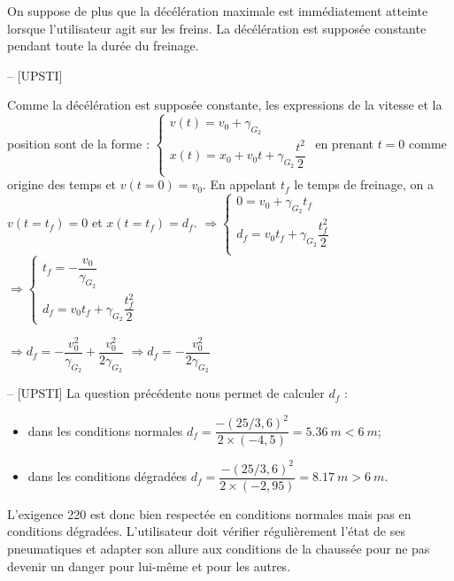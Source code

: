 On suppose de plus que la décélération maximale est immédiatement atteinte lorsque l'utilisateur agit sur les freins. La décélération est supposée constante pendant toute la durée du freinage.
\fi

\ifprof
\begin{corrige}-- [UPSTI]

Comme la décélération est supposée constante, les expressions de la vitesse et la position sont de la forme :
$\left\{
\begin{array}{l}
v(t)=v_0+\gamma_{G_2} \\
x(t)=x_0+v_0 t+\gamma_{G_2}  \dfrac{t^2}{2} \\
\end{array}
\right.$
en prenant $t=0$ comme origine des temps et $v(t=0)=v_0$.
En appelant $t_f$ le temps de freinage, on a $v(t=t_f)=0$ et $x(t=t_f)=d_f$.
$\Rightarrow 
\left\{
\begin{array}{l}
0=v_0+\gamma_{G_2 } t_f \\
d_f=v_0 t_f+\gamma_{G_2} \dfrac{t_f^2}{2} \\
\end{array}
\right.$
$\Rightarrow 
\left\{
\begin{array}{l}
t_f=-\dfrac{v_0}{\gamma_{G_2}} \\
d_f=v_0 t_f+\gamma_{G_2} \dfrac{t_f^2}{2}
\end{array}
\right.$

$\Rightarrow  d_f=-\dfrac{v_0^2}{\gamma_{G_2 }} +\dfrac{v_0^2}{2 \gamma_{G_2 }}$
$\Rightarrow  d_f=-\dfrac{v_0^2}{2\gamma_{G_2 }} $
\end{corrige}
\else
\fi


\ifprof
\begin{corrige}-- [UPSTI]
La question précédente nous permet de calculer $d_f$ :
\begin{itemize}
\item dans les conditions normales $d_f=\dfrac{ -(25/3,6)^2}{2\times (-4,5)}=\SI{5,36}{m}<\SI{6}{m}$;
\item dans les conditions dégradées $d_f=\dfrac{-(25/3,6)^2}{2\times (-2,95)}=\SI{8,17}{m}>\SI{6}{m}$.
\end{itemize}
L’exigence 220 est donc bien respectée en conditions normales mais pas en conditions dégradées. L’utilisateur doit vérifier régulièrement l’état de ses pneumatiques et adapter son allure aux conditions de la chaussée pour ne pas devenir un danger pour lui-même et pour les autres.

\end{corrige}
\else
\fi

